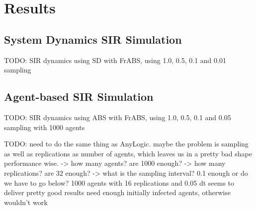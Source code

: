 \section{Results}

\subsection{System Dynamics SIR Simulation}
TODO: SIR dynamics using SD with FrABS, using 1.0, 0.5, 0.1 and 0.01 sampling 

\subsection{Agent-based SIR Simulation}
TODO: SIR dynamics using ABS with FrABS, using 1.0, 0.5, 0.1 and 0.05 sampling with 1000 agents

TODO: need to do the same thing as AnyLogic. maybe the problem is sampling as well as replications as number of agents, which leaves us in a pretty bad shape performance wise.
	-> how many agents? are 1000 enough?
	-> how many replications? are 32 enough?
	-> what is the sampling interval? 0.1 enough or do we have to go below?
	1000 agents with 16 replications and 0.05 dt seems to deliver pretty good results
	need enough initially infected agents, otherwise wouldn't work

